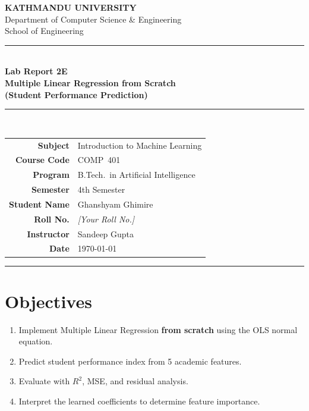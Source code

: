 \documentclass[12pt,a4paper]{article}
\begin{document}
\begin{center}
  {\Large\bfseries\color{kuBlue} KATHMANDU UNIVERSITY}\\[4pt]
  {\normalsize Department of Computer Science \& Engineering}\\[2pt]
  {\normalsize School of Engineering}\\[10pt]
  \rule{\linewidth}{1.5pt}\\[6pt]
  {\large\bfseries Lab Report 2E}\\[4pt]
  {\LARGE\bfseries Multiple Linear Regression from Scratch\\[4pt](Student Performance Prediction)}\\[4pt]
  \rule{\linewidth}{0.8pt}\\[10pt]
\end{center}

\begin{center}
\renewcommand{\arraystretch}{1.4}
\begin{tabular}{r l}
  \textbf{Subject}      & Introduction to Machine Learning \\
  \textbf{Course Code}  & COMP~401 \\
  \textbf{Program}      & B.Tech.\ in Artificial Intelligence \\
  \textbf{Semester}     & 4th Semester \\
  \textbf{Student Name} & Ghanshyam Ghimire \\
  \textbf{Roll No.}     & \textit{[Your Roll No.]} \\
  \textbf{Instructor}   & Sandeep Gupta \\
  \textbf{Date}         & \today \\
\end{tabular}
\end{center}
\vspace{10pt}\hrule\vspace{16pt}

\section{Objectives}
\begin{enumerate}[label=\arabic*.]
  \item Implement Multiple Linear Regression \textbf{from scratch} using the OLS normal equation.
  \item Predict student performance index from 5 academic features.
  \item Evaluate with $R^2$, MSE, and residual analysis.
  \item Interpret the learned coefficients to determine feature importance.
\end{enumerate}
\end{document}
